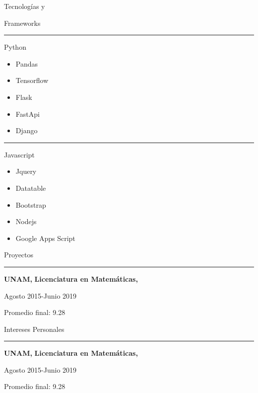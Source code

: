 \documentclass{article}
\begin{document}
\begin{minipage}[t]{0.40\textwidth}  %
\setlength{\baselineskip}{1.7\baselineskip}
\color{white}

\vspace{.5cm}

{\huge Tecnologías 
y 

Frameworks}

\rule{\linewidth}{0.4pt}

{\large \faPython\quad Python}

\begin{itemize}
    \item Pandas
    \item Tensorflow 
    \item Flask
    \item FastApi
    \item Django
\end{itemize}

\rule{\linewidth}{0.4pt}

{\large \faJs\quad Javascript}

\begin{itemize}
  \item Jquery
  \item Datatable 
  \item Bootstrap
  \item Nodejs
  \item Google Apps Script
\end{itemize}


\end{minipage}
\hfill
\begin{minipage}[t]{0.60\textwidth}  %
\setlength{\baselineskip}{0.1\baselineskip}
\vspace{0.5cm}  %

{\large Proyectos}
\rule{\linewidth}{0.4pt}

\vspace{0.2cm}

\large \textbf{UNAM, }
\large \textbf{Licenciatura en Matemáticas,}

{\small Agosto 2015-Junio 2019}

{\small Promedio final: 9.28}

\vspace{0.5cm}

{\large Intereses Personales}
\rule{\linewidth}{0.4pt}

\vspace{0.2cm}

\large \textbf{UNAM, }
\large \textbf{Licenciatura en Matemáticas,}

{\small Agosto 2015-Junio 2019}

{\small Promedio final: 9.28}
\end{minipage}
\end{document}
